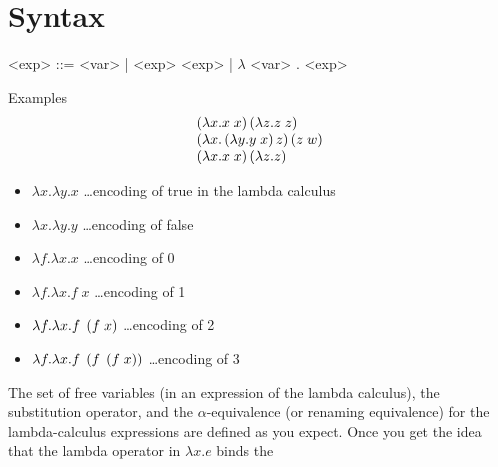 \section{Syntax}

\begin{center}
	\begin{minipage}{0.5\textwidth}
		\begin{grammar}
			<exp> ::= <var>
			| <exp> <exp> \footnotemark
			| $\lambda$ <var> . <exp> \footnotemark
		\end{grammar}
	\end{minipage}
\end{center}

\begin{enumcirc}
	\item
	Examples
	\[
		\begin{array}{l}
			\left( \lambda x. x \; x \right) \left( \lambda z. z \; z \right)           \\
			\left( \lambda x. \left( \lambda y. y \; x \right) z \right) \left( z \; w \right) \\
			\left( \lambda x. x \; x \right) \left( \lambda z. z \right)                \\
		\end{array}
	\]
	\begin{itemize}
		\item
		      $\lambda x. \lambda y. x$ \dots encoding of true in the lambda calculus
		\item
		      $\lambda x. \lambda y. y$ \dots encoding of false
		\item
		      $\lambda f. \lambda x. x$ \dots encoding of 0
		\item
		      $\lambda f. \lambda x. f \; x$ \dots encoding of 1
		\item
		      $\lambda f. \lambda x. f \; \left( f \; x \right)$ \dots encoding of 2
		\item
		      $\lambda f. \lambda x. f \; \left( f \; \left( f \; x \right) \right)$ \dots encoding of 3
	\end{itemize}
	\item
	The set of free variables (in an expression of the lambda calculus), the
	substitution operator, and the $\alpha$-equivalence (or renaming equivalence)
	for the lambda-calculus expressions are defined as you expect.
	Once you get the idea that the lambda operator in $\lambda x. e$ binds the

\end{enumcirc}
